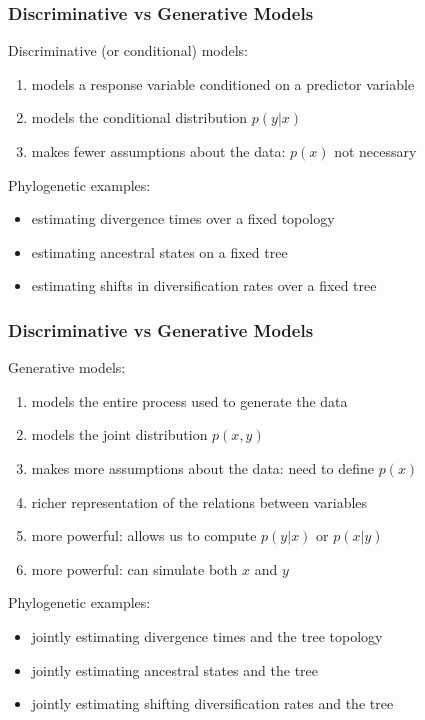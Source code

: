 \documentclass[mathserif]{beamer}
\begin{document}
\begin{frame}
\small
    \frametitle{Discriminative vs Generative Models}
    \begin{block}{Discriminative (or conditional) models:}
    \begin{enumerate}
        \item models a response variable conditioned on a predictor variable
        \item models the conditional distribution $p(y|x)$
        \item makes fewer assumptions about the data: $p(x)$ not necessary
    \end{enumerate}
    \end{block}
    \begin{block}{Phylogenetic examples:} 
    \begin{itemize}
        \item estimating divergence times over a fixed topology
        \item estimating ancestral states on a fixed tree
        \item estimating shifts in diversification rates over a fixed tree
    \end{itemize}
    \end{block}
\end{frame}
\begin{frame}
\small
    \frametitle{Discriminative vs Generative Models}
    \begin{block}{Generative models:}
    \begin{enumerate}
        \item models the entire process used to generate the data
        \item models the joint distribution $p(x, y)$
        \item makes more assumptions about the data: need to define $p(x)$ 
        \item richer representation of the relations between variables
        \item more powerful: allows us to compute $p(y|x)$ or $p(x|y)$ 
        \item more powerful: can simulate both $x$ and $y$
    \end{enumerate}
    \end{block}
    \begin{block}{Phylogenetic examples:} 
    \begin{itemize}
        \item jointly estimating divergence times and the tree topology
        \item jointly estimating ancestral states and the tree
        \item jointly estimating shifting diversification rates and the tree
    \end{itemize}
    \end{block}
\end{frame}
\end{document}
